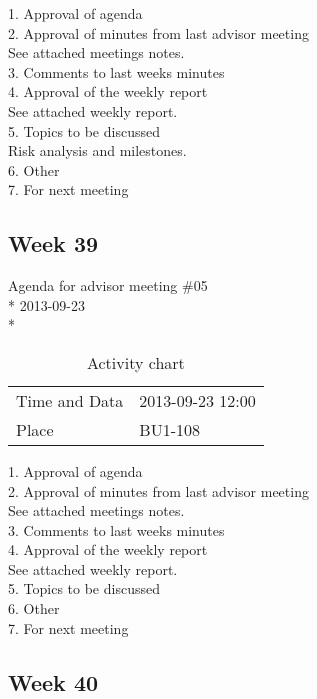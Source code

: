 1. Approval of agenda \\
2. Approval of minutes from last advisor meeting \\
See attached meetings notes. \\
3. Comments to last weeks minutes \\
4. Approval of the weekly report \\
See attached weekly report. \\
5. Topics to be discussed \\
Risk analysis and milestones. \\
6. Other \\
7. For next meeting \\

\newpage
\subsection{Week 39}

\begin{center}
Agenda for advisor meeting \#05\\*
2013-09-23\\*
\end{center}

\begin{table}[H]
\begin{center}
\begin{tabular}{ l | l }
Time and Data & 2013-09-23 12:00 \\
Place & BU1-108 \\
\end{tabular}
\end{center}
\caption{Activity chart}
\label{table:activityChartAdvisorAgendaWeek39}
\end{table}


1. Approval of agenda \\
2. Approval of minutes from last advisor meeting \\
See attached meetings notes. \\
3. Comments to last weeks minutes \\
4. Approval of the weekly report \\
See attached weekly report. \\
5. Topics to be discussed \\
6. Other \\
7. For next meeting \\

\newpage
\subsection{Week 40}

